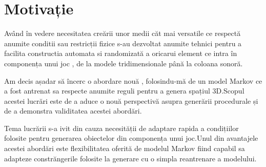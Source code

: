 \chapter*{Motivație} 

Având în vedere necesitatea creării unor medii căt mai versatile ce respectă anumite conditii sau restricții fizice s-au dezvoltat anumite tehnici pentru a facilita constructia automata si randomizată a oricarui element ce intra în componența unui joc , de la modele tridimensionale până la coloana sonoră.\par

Am decis așadar să încerc o abordare nouă , folosindu-mă de un model Markov ce a fost antrenat sa respecte anumite reguli pentru a genera spațiul 3D.Scopul acestei lucrări este de a aduce o nouă perspectivă asupra generării procedurale și de a demonstra validitatea acestei abordări.\par

Tema lucrării s-a ivit din cauza necesității de adaptare rapida a condițiilor folosite pentru generarea obiectelor din componența unui joc.Unul din avantajele acestei abordări este flexibilitatea oferită de modelul Markov fiind capabil sa adapteze constrăngerile folosite la generare cu o simpla reantrenare a modelului.